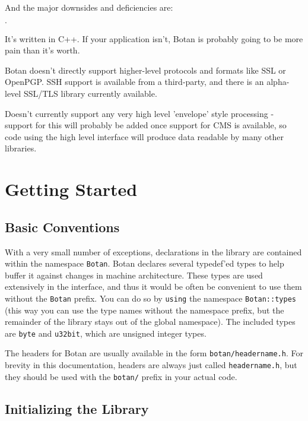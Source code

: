 \documentclass{article}
\newcommand{\filename}[1]{\texttt{#1}}
\newcommand{\keyword}[1]{\texttt{#1}}
\newcommand{\type}[1]{\texttt{#1}}
\newcommand{\namespace}[1]{\texttt{#1}}
\begin{document}
\noindent
And the major downsides and deficiencies are:

\begin{list}{$\cdot$}
  \item It's written in C++. If your application isn't, Botan is probably
        going to be more pain than it's worth.
  \item

  \item Botan doesn't directly support higher-level protocols and
        formats like SSL or OpenPGP. SSH support is available from a
        third-party, and there is an alpha-level SSL/TLS library
        currently available.

  \item Doesn't currently support any very high level 'envelope' style
        processing - support for this will probably be added once support for
        CMS is available, so code using the high level interface will produce
        data readable by many other libraries.
\end{list}

\pagebreak
\section{Getting Started}

\subsection{Basic Conventions}

With a very small number of exceptions, declarations in the library
are contained within the namespace \namespace{Botan}. Botan declares
several typedef'ed types to help buffer it against changes in machine
architecture.  These types are used extensively in the interface, and
thus it would be often be convenient to use them without the
\namespace{Botan} prefix. You can do so by \keyword{using} the
namespace \namespace{Botan::types} (this way you can use the type
names without the namespace prefix, but the remainder of the library
stays out of the global namespace). The included types are \type{byte}
and \type{u32bit}, which are unsigned integer types.

The headers for Botan are usually available in the form
\filename{botan/headername.h}. For brevity in this documentation,
headers are always just called \filename{headername.h}, but they
should be used with the \filename{botan/} prefix in your actual code.

\subsection{Initializing the Library}
\end{document}
